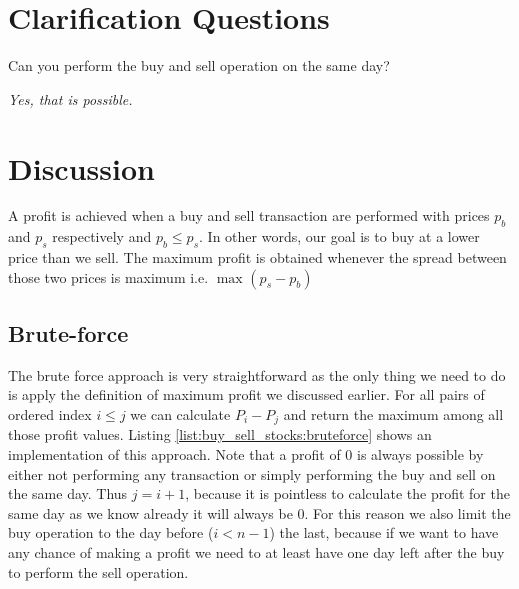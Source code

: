 \section{Clarification Questions}

\begin{QandA}
	\item \begin{questionitem} \begin{question} Can you perform the buy and sell operation on the same day?  \end{question}      
    \begin{answered}
		\textit{Yes, that is possible.}
	\end{answered} \end{questionitem}
\end{QandA}

\section{Discussion}
\label{buy_sell_stocks:sec:discussion}
A profit is achieved when a buy and sell transaction are performed with prices $p_b$ and $p_s$ respectively and $p_b \leq p_s$. In other words, our goal is to buy at a lower price than we sell. The maximum profit is obtained whenever the spread between those two prices is maximum i.e. $\max_{}{(p_s - p_b)}$

\subsection{Brute-force}
\label{buy_sell_stocks:sec:bruteforce}
The brute force approach is very straightforward as the only thing we need to do is apply the definition of maximum profit we discussed earlier. For all pairs of ordered index $i \leq j$ we can calculate $P_i - P_j$ and return the maximum among all those profit values. Listing \ref{list:buy_sell_stocks:bruteforce} shows an implementation of this approach. Note that a profit of $0$ is always possible by either not performing any transaction or simply performing the buy and sell on the same day. Thus $j = i+1$, because it is pointless to calculate the profit for the same day as we know already it will always be $0$. For this reason we also limit the buy operation to the day before ($i< n-1$) the last, because if we want to have any chance of making a profit we need to at least have one day left after the buy to perform the sell operation. 



